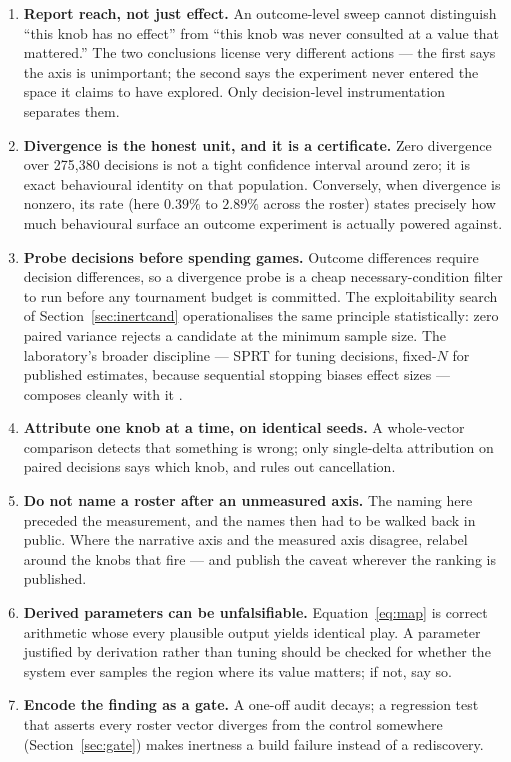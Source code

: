 \documentclass[11pt]{article}
\begin{document}
\begin{enumerate}
  \item \textbf{Report reach, not just effect.} An outcome-level sweep cannot distinguish ``this
  knob has no effect'' from ``this knob was never consulted at a value that mattered.'' The two
  conclusions license very different actions --- the first says the axis is unimportant; the
  second says the experiment never entered the space it claims to have explored. Only
  decision-level instrumentation separates them.
  \item \textbf{Divergence is the honest unit, and it is a certificate.} Zero divergence over
  275{,}380 decisions is not a tight confidence interval around zero; it is exact behavioural
  identity on that population. Conversely, when divergence is nonzero, its rate (here $0.39\%$
  to $2.89\%$ across the roster) states precisely how much behavioural surface an outcome
  experiment is actually powered against.
  \item \textbf{Probe decisions before spending games.} Outcome differences require decision
  differences, so a divergence probe is a cheap necessary-condition filter to run before any
  tournament budget is committed. The exploitability search of Section~\ref{sec:inertcand}
  operationalises the same principle statistically: zero paired variance rejects a candidate at
  the minimum sample size. The laboratory's broader discipline --- SPRT for tuning decisions,
  fixed-$N$ for published estimates, because sequential stopping biases effect sizes ---
  composes cleanly with it \cite{botlab}.
  \item \textbf{Attribute one knob at a time, on identical seeds.} A whole-vector comparison
  detects that something is wrong; only single-delta attribution on paired decisions says which
  knob, and rules out cancellation.
  \item \textbf{Do not name a roster after an unmeasured axis.} The naming here preceded the
  measurement, and the names then had to be walked back in public. Where the narrative axis and
  the measured axis disagree, relabel around the knobs that fire --- and publish the caveat
  wherever the ranking is published.
  \item \textbf{Derived parameters can be unfalsifiable.} Equation~\eqref{eq:map} is correct
  arithmetic whose every plausible output yields identical play. A parameter justified by
  derivation rather than tuning should be checked for whether the system ever samples the region
  where its value matters; if not, say so.
  \item \textbf{Encode the finding as a gate.} A one-off audit decays; a regression test that
  asserts every roster vector diverges from the control somewhere (Section~\ref{sec:gate}) makes
  inertness a build failure instead of a rediscovery.
\end{enumerate}
\end{document}
